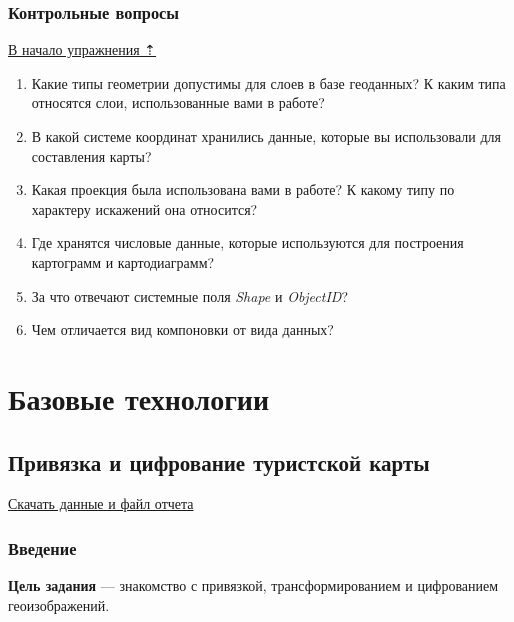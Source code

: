 \documentclass[]{book}
\theoremstyle{definition}
\theoremstyle{definition}
\theoremstyle{definition}
\theoremstyle{remark}
\begin{document}
\hypertarget{map-design-economic-questions}{%
\section{Контрольные вопросы}\label{map-design-economic-questions}}

\protect\hyperlink{map-design-economic}{В начало упражнения ⇡}

\begin{enumerate}
\def\labelenumi{\arabic{enumi}.}
\item
  Какие типы геометрии допустимы для слоев в базе геоданных? К каким
  типа относятся слои, использованные вами в работе?
\item
  В какой системе координат хранились данные, которые вы использовали
  для составления карты?
\item
  Какая проекция была использована вами в работе? К какому типу по
  характеру искажений она относится?
\item
  Где хранятся числовые данные, которые используются для построения
  картограмм и картодиаграмм?
\item
  За что отвечают системные поля \emph{Shape} и \emph{ObjectID}?
\item
  Чем отличается вид компоновки от вида данных?
\end{enumerate}

\hypertarget{part--}{%
\part{Базовые технологии}\label{part--}}

\hypertarget{map-ref-general}{%
\chapter{Привязка и цифрование туристской карты}\label{map-ref-general}}

\href{http://autolab.geogr.msu.ru/gis/data/Ex05.zip}{Скачать данные и
файл отчета}

\hypertarget{map-ref-general-intro}{%
\section{Введение}\label{map-ref-general-intro}}

\textbf{Цель задания} --- знакомство с привязкой, трансформированием и
цифрованием геоизображений.
\end{document}
